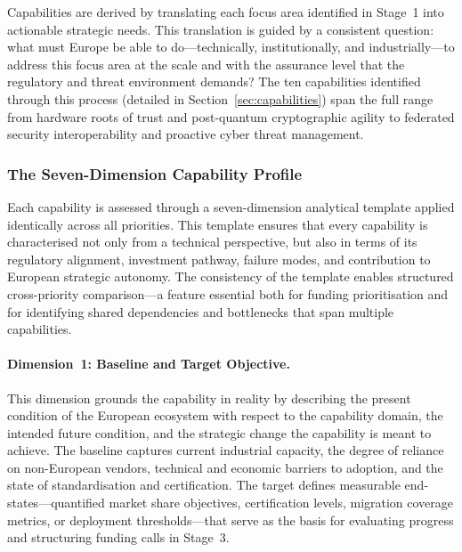 Capabilities are derived by translating each focus area identified in Stage~1 into actionable strategic needs. This translation is guided by a consistent question: what must Europe be able to do---technically, institutionally, and industrially---to address this focus area at the scale and with the assurance level that the regulatory and threat environment demands? The ten capabilities identified through this process (detailed in Section~\ref{sec:capabilities}) span the full range from hardware roots of trust and post-quantum cryptographic agility to federated security interoperability and proactive cyber threat management.


\subsubsection{The Seven-Dimension Capability Profile}
\label{sec:meth-7dim}

Each capability is assessed through a seven-dimension analytical template applied identically across all priorities. This template ensures that every capability is characterised not only from a technical perspective, but also in terms of its regulatory alignment, investment pathway, failure modes, and contribution to European strategic autonomy. The consistency of the template enables structured cross-priority comparison---a feature essential both for funding prioritisation and for identifying shared dependencies and bottlenecks that span multiple capabilities.

\paragraph{Dimension~1: Baseline and Target Objective.}
This dimension grounds the capability in reality by describing the present condition of the European ecosystem with respect to the capability domain, the intended future condition, and the strategic change the capability is meant to achieve. The baseline captures current industrial capacity, the degree of reliance on non-European vendors, technical and economic barriers to adoption, and the state of standardisation and certification. The target defines measurable end-states---quantified market share objectives, certification levels, migration coverage metrics, or deployment thresholds---that serve as the basis for evaluating progress and structuring funding calls in Stage~3.

